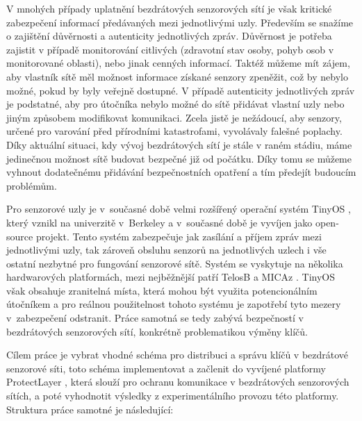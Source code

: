 \documentclass[11pt,final,twoside]{fithesis2}
\begin{document}
V mnohých případy uplatnění bezdrátových senzorových sítí je však kritické zabezpečení informací předávaných mezi jednotlivými uzly. Především se snažíme o zajištění důvěrnosti a autenticity jednotlivých 
zpráv. Důvěrnost je potřeba zajistit v případě monitorování citlivých (zdravotní stav osoby, pohyb osob v monitorované oblasti), nebo jinak cenných informací. Taktéž můžeme mít zájem, aby vlastník sítě měl 
možnost informace získané senzory zpeněžit, což by nebylo možné, pokud by byly veřejně dostupné. V případě autenticity jednotlivých zpráv je podstatné, aby pro útočníka nebylo možné do sítě přidávat vlastní 
uzly nebo jiným způsobem modifikovat komunikaci. Zcela jistě je nežádoucí, aby senzory, určené pro varování před přírodními katastrofami, vyvolávaly falešné poplachy. Díky aktuální situaci, kdy vývoj 
bezdrátových sítí je stále v raném stádiu, máme jedinečnou možnost sítě budovat bezpečné již od počátku. Díky tomu se můžeme vyhnout dodatečnému přidávání bezpečnostních opatření a tím předejít 
budoucím problémům.

Pro senzorové uzly je v~současné době velmi rozšířený operační systém TinyOS \cite{Levis2005}, který vznikl na univerzitě v~Berkeley a v~současné době je vyvíjen jako open-source projekt.  Tento systém 
zabezpečuje jak zasílání a příjem zpráv mezi jednotlivými uzly, tak zároveň obsluhu senzorů na jednotlivých uzlech i vše ostatní nezbytné pro fungování senzorové sítě. Systém se vyskytuje na několika 
hardwarových platformách, mezi nejběžnější patří TelosB a MICAz \cite{Inc.}\cite{MemsicInc.}. TinyOS však obsahuje zranitelná místa, která mohou být využita potencionálním útočníkem \cite{Drexler2010} a pro 
reálnou použitelnost tohoto systému je zapotřebí tyto mezery v~zabezpečení odstranit. Práce samotná se tedy zabývá bezpečností v bezdrátových senzorových sítí, konkrétně problematikou výměny klíčů.

Cílem práce je vybrat vhodné schéma pro distribuci a správu klíčů v bezdrátové senzorové síti, toto schéma implementovat a začlenit do vyvíjené platformy ProtectLayer \cite{Svenda2014a}, která slouží pro 
ochranu komunikace v bezdrátových senzorových sítích, a poté vyhodnotit výsledky z experimentálního provozu této platformy. Struktura práce samotné je následující:
\end{document}
